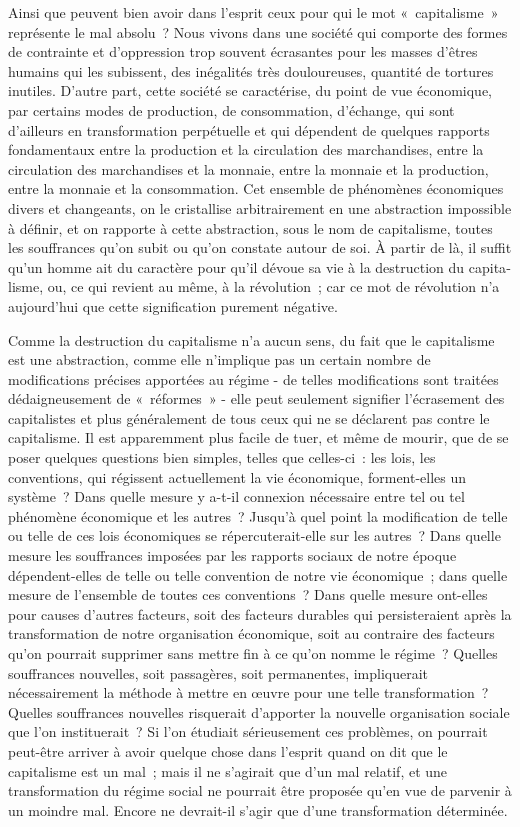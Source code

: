 \documentclass[french,twoside]{book} %
\begin{document}
\noindent Ainsi que peuvent bien avoir dans l'esprit ceux pour qui le mot « capitalisme » représente le mal absolu ? Nous vivons dans une société qui comporte des formes de contrainte et d'oppression trop souvent écrasantes pour les masses d'êtres humains qui les subissent, des inégalités très doulou­reuses, quantité de tortures inutiles. D'autre part, cette société se caractérise, du point de vue économique, par certains modes de production, de consom­mation, d'échange, qui sont d'ailleurs en transformation perpétuelle et qui dépendent de quelques rapports fondamentaux entre la production et la circulation des marchandises, entre la circulation des marchandises et la monnaie, entre la monnaie et la production, entre la monnaie et la consom­mation. Cet ensemble de phénomènes économiques divers et changeants, on le cristallise arbitrairement en une abstraction impossible à définir, et on rapporte à cette abstraction, sous le nom de capitalisme, toutes les souffrances qu'on subit ou qu'on constate autour de soi. À partir de là, il suffit qu'un homme ait du caractère pour qu'il dévoue sa vie à la destruction du capita­lisme, ou, ce qui revient au même, à la révolution ; car ce mot de révolution n'a aujourd'hui que cette signification purement négative.\par
Comme la destruction du capitalisme n'a aucun sens, du fait que le capitalisme est une abstraction, comme elle n'implique pas un certain nombre de modifications précises apportées au régime - de telles modifications sont traitées dédaigneusement de « réformes » - elle peut seulement signifier l'écra­sement des capitalistes et plus généralement de tous ceux qui ne se déclarent pas contre le capitalisme. Il est apparemment plus facile de tuer, et même de mourir, que de se poser quelques questions bien simples, telles que celles-ci : les lois, les conventions, qui régissent actuellement la vie économique, forment-elles un système ? Dans quelle mesure y a-t-il connexion nécessaire entre tel ou tel phénomène économique et les autres ? Jusqu'à quel point la modification de telle ou telle de ces lois économiques se répercuterait-elle sur les autres ? Dans quelle mesure les souffrances imposées par les rapports sociaux de notre époque dépendent-elles de telle ou telle convention de notre vie économique ; dans quelle mesure de l'ensemble de toutes ces conven­tions ? Dans quelle mesure ont-elles pour causes d'autres facteurs, soit des facteurs durables qui persisteraient après la transformation de notre organi­sation économique, soit au contraire des facteurs qu'on pourrait supprimer sans mettre fin à ce qu'on nomme le régime ? Quelles souffrances nouvelles, soit passagères, soit permanentes, impliquerait nécessairement la méthode à mettre en œuvre pour une telle transformation ? Quelles souffrances nouvelles risquerait d'apporter la nouvelle organisation sociale que l'on instituerait ? Si l'on étudiait sérieusement ces problèmes, on pourrait peut-être arriver à avoir quelque chose dans l'esprit quand on dit que le capitalisme est un mal ; mais il ne s'agirait que d'un mal relatif, et une transformation du régime social ne pourrait être proposée qu'en vue de parvenir à un moindre mal. Encore ne devrait-il s'agir que d'une transformation déterminée.\par
\end{document}
